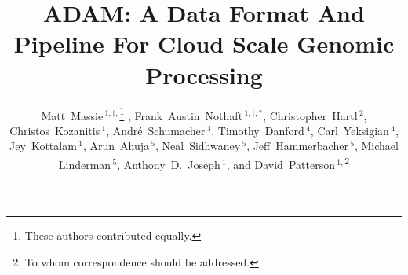 \documentclass{bioinfo}
\begin{document}

\title[ADAM: Cloud Scale Genomic Processing]{ADAM: A Data Format And Pipeline For Cloud Scale Genomic Processing}
\author[Massie and Nothaft \textit{et~al}]{Matt~Massie\,$^{1,\dagger,}$\footnote{These authors contributed equally.} , Frank~Austin~Nothaft\,$^{1,\dagger, *}$,
Christopher~Hartl\,$^{2}$, Christos~Kozanitis\,$^1$, Andr\'{e}~Schumacher\,$^3$, Timothy~Danford\,$^4$, Carl~Yeksigian\,$^4$, Jey~Kottalam\,$^1$,
Arun~Ahuja\,$^5$, Neal~Sidhwaney\,$^5$, Jeff~Hammerbacher\,$^5$, Michael Linderman\,$^5$, Anthony~D.~Joseph\,$^1$, and David~Patterson$\,^{1,}$\footnote{To whom
correspondence should be addressed.}}
\address{$^{1}$Department of Electrical Engineering and Computer Science, University of California, Berkeley, CA\\
$^{2}$The Broad Institute of MIT and Harvard, Cambridge, MA\\
$^{3}$International Computer Science Institute (ICSI), University of California, Berkeley, CA\\
$^{4}$GenomeBridge, Cambridge, MA\\
$^{5}$Carl Icahn School of Medicine at Mount Sinai, New York, NY}



\maketitle
\end{document}
